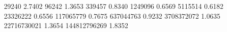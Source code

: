 29240        2.7402
96242        1.3653
339457       0.8340
1249096      0.6569
5115514      0.6182
23326222     0.6556
117065779    0.7675
637044763    0.9232
3708372072   1.0635
22716730021  1.3654
144812796269 1.8352
